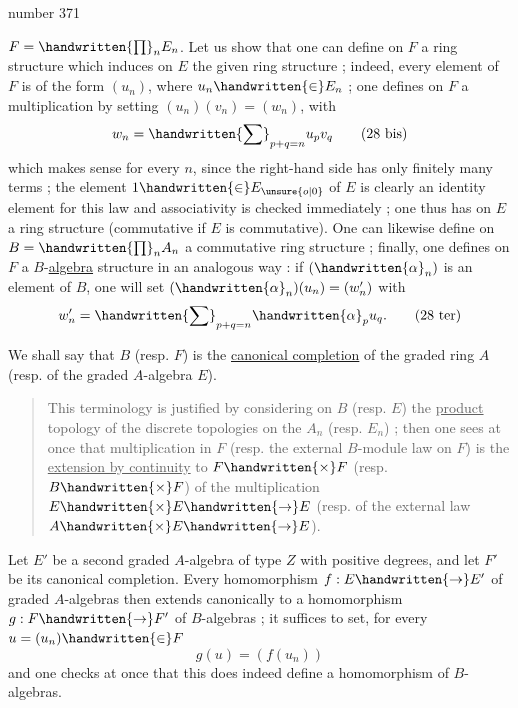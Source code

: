 \begin{flushright}number 371\end{flushright}

$F=\handwritten{\prod}_{n}E_n$. Let us show that one can define on $F$ a ring structure which induces on $E$ the given ring structure ; indeed, every element of $F$ is of the form $(u_n)$, where $u_n\handwritten{\in}E_n$ ; one defines on $F$ a multiplication by setting $(u_n)(v_n)=(w_n)$, with
\[
w_n=\handwritten{\sum}_{p+q=n}u_pv_q
\tag*{(28 bis)}
\]
which makes sense for every $n$, since the right-hand side has only finitely many terms ; the element $1\handwritten{\in}E_{\unsure{o|0}}$ of $E$ is clearly an identity element for this law and associativity is checked immediately ; one thus has on $E$ a ring structure (commutative if $E$ is commutative). One can likewise define on $B=\handwritten{\prod}_{n}A_n$ a commutative ring structure ; finally, one defines on $F$ a $B$-\uline{algebra} structure in an analogous way : if $(\handwritten{\alpha}_n)$ is an element of $B$, one will set $(\handwritten{\alpha}_n)(u_n)=(w'_n)$ with
\[
w'_n=\handwritten{\sum}_{p+q=n}\handwritten{\alpha}_pu_q.
\tag*{(28 ter)}
\]

We shall say that $B$ (resp. $F$) is the \uline{canonical completion} of the graded ring $A$ (resp. of the graded $A$-algebra $E$).

\begin{quote}
\handwritten{*}This terminology is justified by considering on $B$ (resp. $E$) the \uline{product} topology of the discrete topologies on the $A_n$ (resp. $E_n$) ; then one sees at once that multiplication in $F$ (resp. the external $B$-module law on $F$) is the \uline{extension by continuity} to $F\handwritten{\times}F$ (resp. $B\handwritten{\times}F$) of the multiplication $E\handwritten{\times}E\handwritten{\to}E$ (resp. of the external law $A\handwritten{\times}E\handwritten{\to}E$).\handwritten{*}
\end{quote}

Let $E'$ be a second graded $A$-algebra of type $Z$ with positive degrees, and let $F'$ be its canonical completion. Every homomorphism $f:E\handwritten{\to}E'$ of graded $A$-algebras then extends canonically to a homomorphism $g:F\handwritten{\to}F'$ of $B$-algebras ; it suffices to set, for every $u=(u_n)\handwritten{\in}F$
\[
g(u)=(f(u_n))
\]
and one checks at once that this does indeed define a homomorphism of $B$-algebras.
